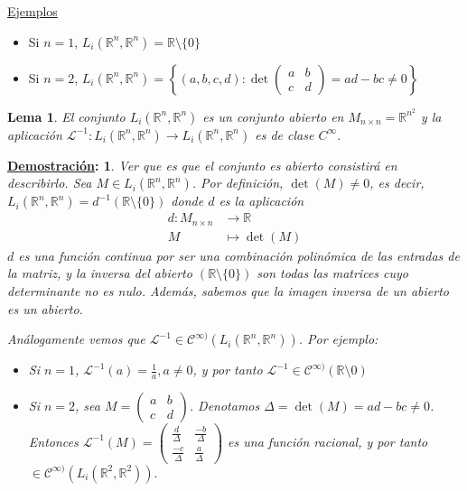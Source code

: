 \documentclass[10pt,a4paper,openright]{book}
\theoremstyle{break}
\newtheorem*{lema}{Lema}
\newtheorem*{demo}{\underline{Demostración}:}
\begin{document}
\underline{Ejemplos}
\begin{itemize}
\item Si $n = 1$, $L_i (\mathbb{R}^n, \mathbb{R}^n) = \mathbb{R} \setminus \{0\}$

\item Si $n = 2$, $L_i (\mathbb{R}^n, \mathbb{R}^n) = \left\lbrace (a,b,c,d) : \det \begin{pmatrix}
a & b \\ c & d
\end{pmatrix}  = ad - bc \neq 0 \right\rbrace$
\end{itemize}

\begin{lema}
El conjunto $L_i (\mathbb{R}^n, \mathbb{R}^n)$ es un conjunto abierto en $M_{n \times n} = \mathbb{R}^{n^2}$ y la aplicación $\mathcal{L}^{-1} : L_i (\mathbb{R}^n, \mathbb{R}^n) \to L_i (\mathbb{R}^n, \mathbb{R}^n)$ es de clase $C^{\infty}$.
\end{lema}

\begin{demo}
Ver que es que el conjunto es abierto consistirá en describirlo. Sea $M \in L_i (\mathbb{R}^n, \mathbb{R}^n)$. Por definición, $\det (M) \neq 0$, es decir, $L_i (\mathbb{R}^n, \mathbb{R}^n) = d^{-1} (\mathbb{R} \setminus \{0\})$ donde $d$ es la aplicación \begin{align*}
d: M_{n \times n} &\to \mathbb{R} \\ M &\mapsto \det(M)
\end{align*}
$d$ es una función continua por ser una combinación polinómica de las entradas de la matriz, y la inversa del abierto $(\mathbb{R} \setminus \{0\})$ son todas las matrices cuyo determinante no es nulo. Además, sabemos que la imagen inversa de un abierto es un abierto.

Análogamente vemos que $\mathcal{L}^{-1} \in \mathcal{C}^{\infty )} (L_i (\mathbb{R}^n, \mathbb{R}^n))$. Por ejemplo:
\begin{itemize}
\item Si $n = 1$, $\mathcal{L}^{-1} (a) = \frac{1}{a}, a \neq 0$, y por tanto $\mathcal{L}^{-1} \in \mathcal{C}^{\infty )}(\mathbb{R} \setminus 0)$

\item Si $n = 2$, sea $M = \begin{pmatrix}
a & b \\ c & d
\end{pmatrix}$. Denotamos $\Delta = \det (M) = ad -  bc \neq 0$. Entonces $\mathcal{L}^{-1} (M) = \begin{pmatrix}
\frac{d}{\Delta} & \frac{-b}{\Delta} \\ \frac{-c}{\Delta} & \frac{a}{\Delta}
\end{pmatrix}$ es una función racional, y por tanto $\in \mathcal{C}^{\infty )} (L_i (\mathbb{R}^2, \mathbb{R}^2)).$
\end{itemize}
\end{demo}
\end{document}
